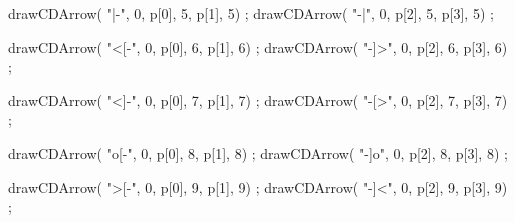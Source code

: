 drawCDArrow(   "|-", 0, p[0], 5, p[1], 5) ;
drawCDArrow(   "-|", 0, p[2], 5, p[3], 5) ;

drawCDArrow(   "<[-", 0, p[0], 6, p[1], 6) ;
drawCDArrow(   "-]>", 0, p[2], 6, p[3], 6) ;

drawCDArrow(   "<]-", 0, p[0], 7, p[1], 7) ;
drawCDArrow(   "-[>", 0, p[2], 7, p[3], 7) ;

drawCDArrow(   "o[-", 0, p[0], 8, p[1], 8) ;
drawCDArrow(   "-]o", 0, p[2], 8, p[3], 8) ;

drawCDArrow(   ">[-", 0, p[0], 9, p[1], 9) ;
drawCDArrow(   "-]<", 0, p[2], 9, p[3], 9) ;



\stopMPpage